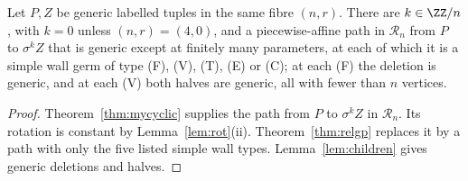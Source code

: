 \begin{lemma}[transport]\label{lem:transport}\leanok
Let $P,Z$ be generic labelled tuples in the same fibre $(n,r)$. There are
$k\in\ZZ/n$, with $k=0$ unless $(n,r)=(4,0)$, and a piecewise-affine path in
$\mathcal R_n$ from $P$ to $\sigma^kZ$ that is generic except at finitely
many parameters, at each of which it is a simple wall germ of type (F), (V),
(T), (E) or (C); at each (F) the deletion is generic, and at each (V) both
halves are generic, all with fewer than $n$ vertices. 
\end{lemma}
\begin{proof}\leanok{}
Theorem~\ref{thm:mycyclic} supplies the path from $P$ to $\sigma^kZ$
in $\mathcal R_n$. Its rotation is constant by Lemma~\ref{lem:rot}(ii).
Theorem~\ref{thm:relgp} replaces it by a path with only the five listed
simple wall types. Lemma~\ref{lem:children} gives generic deletions and
halves.
\end{proof}

